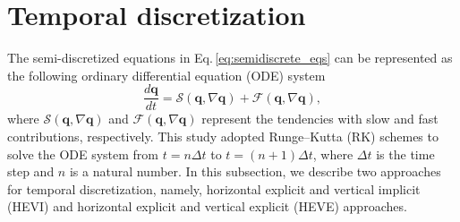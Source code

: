 \section{Temporal discretization}
The semi-discretized equations in Eq.\,\eqref{eq:semidiscrete_eqs} can be represented  
as the following ordinary differential equation (ODE) system  
\begin{equation}
  \dfrac{d \bm{q}}{d t} = \mathcal{S}(\bm{q},\nabla\bm{q}) + \mathcal{F}(\bm{q},\nabla\bm{q}), 
\end{equation}
where 
$\mathcal{S}(\bm{q},\nabla\bm{q})$ and $\mathcal{F}(\bm{q},\nabla\bm{q})$ 
represent the tendencies with slow and fast contributions, respectively.  
This study adopted Runge--Kutta (RK) schemes to solve the ODE system 
from $t=n\Delta t$ to $t=(n+1)\Delta t$, 
where $\Delta t$ is the time step and $n$ is a natural number. 
In this subsection, 
we describe two approaches for temporal discretization, 
namely, 
horizontal explicit and vertical implicit (HEVI) 
and horizontal explicit and vertical explicit (HEVE) approaches. 



